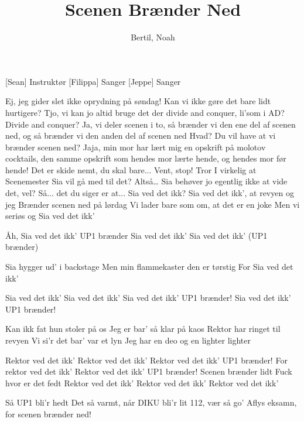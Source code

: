 \documentclass[a4paper,11pt]{article}
\title{Scenen Brænder Ned}
\author{Bertil, Noah }
\begin{document}
\maketitle

\begin{roles}
[Sean] Instruktør
[Filippa] Sanger
[Jeppe] Sanger
\end{roles}

\begin{props}
\end{props}

\begin{song}
 Ej, jeg gider slet ikke oprydning på søndag! Kan vi ikke gøre det bare lidt hurtigere?
 Tjo, vi kan jo altid bruge det der divide and conquer, li’som i AD?
 Divide and conquer?
 Ja, vi deler scenen i to, så brænder vi den ene del af scenen ned, og så brænder vi den anden del af scenen ned
 Hvad? Du vil have at vi brænder scenen ned?
 Jaja, min mor har lært mig en opskrift på molotov cocktails, den samme opskrift som hendes mor lærte hende, og hendes mor før hende! Det er skide nemt, du skal bare...
 Vent, stop! Tror I virkelig at Scenemester Sia vil gå med til det?
 Altså… Sia behøver jo egentlig ikke at vide det, vel?
 Så... det du siger er at... Sia ved det ikk?
 Sia ved det ikk’, at revyen og jeg
Brænder scenen ned på lørdag
Vi lader bare som om, at det er en joke
Men vi seriøs og Sia ved det ikk’

Åh, Sia ved det ikk’
UP1 brænder
Sia ved det ikk’
Sia ved det ikk’
(UP1 brænder)

Sia hygger ud’ i backstage
Men min flammekaster den er tørstig
For Sia ved det ikk’

Sia ved det ikk’
Sia ved det ikk’
Sia ved det ikk’
UP1 brænder!
Sia ved det ikk’
UP1 brænder!

Kan ikk fat hun stoler på os
Jeg er bar’ så klar på kaos
Rektor har ringet til revyen
Vi si’r det bar’ var et lyn
Jeg har en deo og en lighter
lighter

Rektor ved det ikk’
Rektor ved det ikk’
Rektor ved det ikk’
UP1 brænder!
For rektor ved det ikk’
Rektor ved det ikk’
UP1 brænder!
Scenen brænder lidt
Fuck hvor er det fedt
Rektor ved det ikk’
Rektor ved det ikk’
Rektor ved det ikk’

Så UP1 bli’r hedt
Det så varmt, når DIKU bli’r lit
112, vær så go’
Aflys eksamn, for scenen brænder ned!


\end{song}
\end{document}
